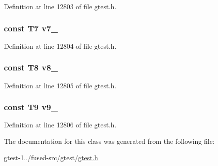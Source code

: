 \-Definition at line 12803 of file gtest.\-h.

\hypertarget{classtesting_1_1internal_1_1ValueArray44_a4063f0b7a528133d018ee488ba44a9a3}{
\subsubsection[{v7\-\_\-}]{\setlength{\rightskip}{0pt plus 5cm}const \-T7 {\bf v7\-\_\-}}}\label{d7/d4e/classtesting_1_1internal_1_1ValueArray44_a4063f0b7a528133d018ee488ba44a9a3}


\-Definition at line 12804 of file gtest.\-h.

\hypertarget{classtesting_1_1internal_1_1ValueArray44_a596bc5260b2474271d1f6910ff6f665d}{
\subsubsection[{v8\-\_\-}]{\setlength{\rightskip}{0pt plus 5cm}const \-T8 {\bf v8\-\_\-}}}\label{d7/d4e/classtesting_1_1internal_1_1ValueArray44_a596bc5260b2474271d1f6910ff6f665d}


\-Definition at line 12805 of file gtest.\-h.

\hypertarget{classtesting_1_1internal_1_1ValueArray44_a6356e16cf54a9dfac8525f20242af31e}{
\subsubsection[{v9\-\_\-}]{\setlength{\rightskip}{0pt plus 5cm}const \-T9 {\bf v9\-\_\-}}}\label{d7/d4e/classtesting_1_1internal_1_1ValueArray44_a6356e16cf54a9dfac8525f20242af31e}


\-Definition at line 12806 of file gtest.\-h.



\-The documentation for this class was generated from the following file\-:\begin{DoxyCompactItemize}
\item 
gtest-\/1../fused-\/src/gtest/\hyperlink{fused-src_2gtest_2gtest_8h}{gtest.\-h}\end{DoxyCompactItemize}
